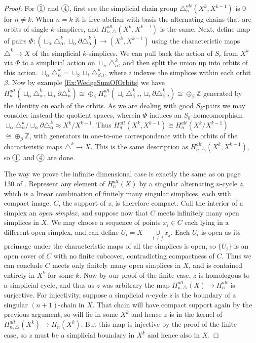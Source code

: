 \documentclass[11pt,a4paper,twoside]{article}
\theoremstyle{plain}
\theoremstyle{definition}
\theoremstyle{definition}
\theoremstyle{definition}
\theoremstyle{definition}
\theoremstyle{definition}
\newcommand*\circled[1]{\tikz[baseline=(char.base)]{
            \node[shape=circle,draw,inner sep=1pt] (char) {#1};}}
\begin{document}
\begin{proof}
For $\circled{1}$ and $\circled{4}$, first see the simplicial chain group $\triangle^{alt}_n(X^k,X^{k\!-\!1})$ is $0$ for $n\neq k$. When $n=k$ it is free abelian with basis the alternating chains that are orbits of single $k$-simplices, and $H^{alt}_{n,\triangle}(X^k,X^{k\!-\!1})$ is the same. Next, define map of pairs $\Phi\!:\!(\sqcup_\alpha\triangle^k_\alpha,\sqcup_\alpha\partial\triangle^k_\alpha)\longrightarrow(X^k,X^{k-1})$ using the characteristic maps $\triangle^k\longrightarrow X$ of the simplicial $k$-simplices. We can pull back the action of $S_r$ from $X^k$ via $\Phi$ to a simplicial action on $\sqcup_\alpha\triangle^k_\alpha$, and then split the union up into orbits of this action. $\sqcup_\alpha\triangle_\alpha^k=\sqcup_\beta\sqcup_i\triangle^k_{\beta,i}$, where $i$ indexes the simplices within each orbit $\beta$. Now by example \ref{Ex:WedgeSumOfOrbits} we have $H^{alt}_n(\sqcup_\alpha\triangle_\alpha^k,\sqcup_\alpha\partial\triangle_\alpha^k)\cong \oplus_\beta H^{alt}_n(\sqcup_i\triangle^k_{\beta,i},\sqcup_i\partial\triangle^k_{\beta,i})\cong\oplus_\beta\mathbb{Z}$ generated by the identity on each of the orbits. As we are dealing with good $S_k$-pairs we may consider instead the quotient spaces, wherein $\Phi$ induces an $S_k$-homeomorphism $\sqcup_\alpha\triangle^k_\alpha/\sqcup_\alpha\partial\triangle^k_\alpha\approx X^k/X^{k-1}$. Thus $H_n^{alt}(X^k,X^{k-1})\cong H_n^{alt}(X^k/X^{k-1})$ $\cong \oplus_\beta\mathbb{Z}$, with generators in one-to-one correspondence with the orbits of the characteristic maps $\triangle^k\rightarrow X$. This is the same description as $H^{alt}_{n,\triangle}(X^k,X^{k-1})$, so $\circled{1}$ and $\circled{4}$ are done.

The way we prove the infinite dimensional case is exactly the same as on page 130 of \cite{algebraictopology}. Represent any element of $H_n^{alt}(X)$ by a singular alternating $n$-cycle $z$, which is a linear combination of finitely many singular simplices, each with compact image. $C$, the support of $z$, is therefore compact. Call the interior of a simplex an \emph{open simplex}, and suppose now that $C$ meets infinitely many open simplices in $X$. We may choose a sequence of points $x_i\in C$ each lying in a different open simplex, and can define $U_i=X-\underset{i\neq j}\cup{x_j}$. Each $U_i$ is open as its preimage under the characteristic maps of all the simplices is open, so $\{U_i\}$ is an open cover of $C$ with no finite subcover, contradicting compactness of $C$. Thus we can conclude $C$ meets only finitely many open simplices in $X$, and is contained entirely in $X^k$ for some $k$. Now by our proof of the finite case, $z$ is homologous to a simplicial cycle, and thus as $z$ was arbitrary the map $H_{n,\triangle}^{alt}(X)\rightarrow H_n^{alt}$ is surjective. For injectivity, suppose a simplicial $n$-cycle $z$ is the boundary of a singular $(n\!+\!1)$-chain in $X$. That chain will have compact support again by the previous argument, so will lie in some $X^k$ and hence $z$ is in the kernel of $H_{n,\triangle}^{alt}(X^k)\rightarrow H_n(X^k)$. But this map is injective by the proof of the finite case, so $z$ must be a simplicial boundary in $X^k$ and hence also in $X$.


\end{proof}
\end{document}
